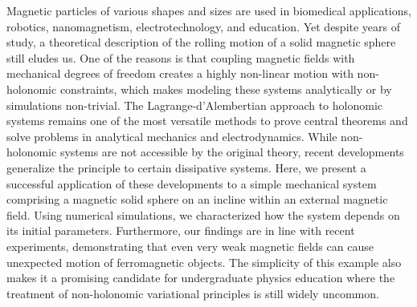 Magnetic particles of various shapes and sizes are used in biomedical applications, robotics, nanomagnetism, electrotechnology, and education. Yet despite years of study, a theoretical description of the rolling motion of a solid magnetic sphere still eludes us. One of the reasons is that coupling magnetic fields with mechanical degrees of freedom creates a highly non-linear motion with non-holonomic constraints, which makes modeling these systems analytically or by simulations non-trivial. The Lagrange-d'Alembertian approach to holonomic systems remains one of the most versatile methods to prove central theorems and solve problems in analytical mechanics and electrodynamics. While non-holonomic systems are not accessible by the original theory, recent developments generalize the principle to certain dissipative systems. \newline Here, we present a successful application of these developments to a simple mechanical system comprising a magnetic solid sphere on an incline within an external magnetic field. Using numerical simulations, we characterized how the system depends on its initial parameters. Furthermore, our findings are in line with recent experiments, demonstrating that even very weak magnetic fields can cause unexpected motion of ferromagnetic objects. The simplicity of this example also makes it a promising candidate for undergraduate physics education where the treatment of non-holonomic variational principles is still widely uncommon.